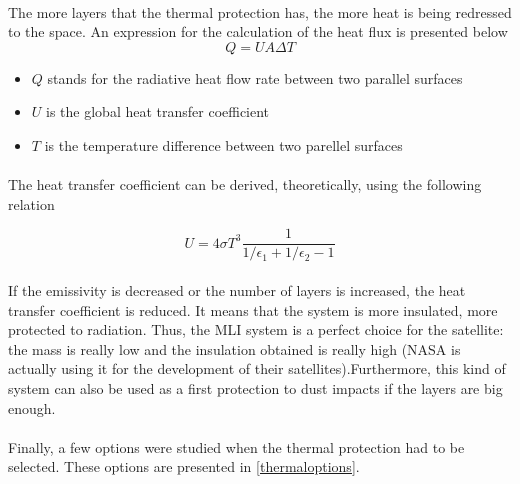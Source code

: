 \paragraph{}The more layers that the thermal protection has, the more heat is being redressed to the space. An expression for the calculation of the heat flux is presented below
\begin{equation}
Q=UA\Delta T
\label{eqheatbasic}
\end{equation}

\begin{itemize}
\item $Q$ stands for the radiative heat flow rate between two parallel surfaces
\item $U$ is the global heat transfer coefficient
\item $T$ is the temperature difference between two parellel surfaces
\end{itemize}

\paragraph{}The heat transfer coefficient can be derived, theoretically, using the following relation

\begin{equation}
U=4\sigma T^3 \frac{1}{1/\epsilon_{1}+1/ \epsilon_{2}-1}
\label{uderivation}
\end{equation}

\paragraph{}If the emissivity is decreased or the number of layers is increased, the heat transfer coefficient is reduced. It means that the system is more insulated, more protected to radiation. Thus, the MLI system is a perfect choice for the satellite: the mass is really low and the insulation obtained is really high (NASA is actually using it for the development of their satellites).Furthermore, this kind of system can also be used as a first protection to dust impacts if the layers are big enough.

\paragraph{}Finally, a few options were studied when the thermal protection had to be selected. These options are presented in \ref{thermaloptions}.

